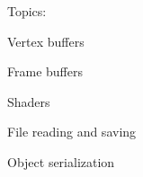 Topics\+:
\begin{DoxyItemize}
\item Vertex buffers
\item Frame buffers
\item Shaders
\item File reading and saving
\item Object serialization 
\end{DoxyItemize}